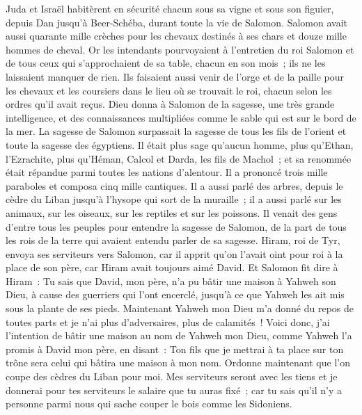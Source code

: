 \begin{multicols}{2}
Juda et Israël habitèrent en sécurité chacun sous sa vigne et sous son figuier, depuis Dan jusqu'à Beer-Schéba, durant toute la vie de Salomon.
Salomon avait aussi quarante mille crèches pour les chevaux destinés à ses chars et douze mille hommes de cheval.
Or les intendants pourvoyaient à l'entretien du roi Salomon et de tous ceux qui s'approchaient de sa table, chacun en son mois~; ils ne les laissaient manquer de rien.
Ils faisaient aussi venir de l'orge et de la paille pour les chevaux et les coursiers dans le lieu où se trouvait le roi, chacun selon les ordres qu'il avait reçus.
Dieu donna à Salomon de la sagesse, une très grande intelligence, et des connaissances multipliées comme le sable qui est sur le bord de la mer.
La sagesse de Salomon surpassait la sagesse de tous les fils de l'orient et toute la sagesse des égyptiens.
Il était plus sage qu'aucun homme, plus qu'Ethan, l'Ezrachite, plus qu'Héman, Calcol et Darda, les fils de Machol~; et sa renommée était répandue parmi toutes les nations d'alentour.
Il a prononcé trois mille paraboles et composa cinq mille cantiques.
Il a aussi parlé des arbres, depuis le cèdre du Liban jusqu'à l'hysope qui sort de la muraille~; il a aussi parlé sur les animaux, sur les oiseaux, sur les reptiles et sur les poissons.
Il venait des gens d'entre tous les peuples pour entendre la sagesse de Salomon, de la part de tous les rois de la terre qui avaient entendu parler de sa sagesse.
\VerseOne{}Hiram, roi de Tyr, envoya ses serviteurs vers Salomon, car il apprit qu'on l'avait oint pour roi à la place de son père, car Hiram avait toujours aimé David.
Et Salomon fit dire à Hiram~:
Tu sais que David, mon père, n'a pu bâtir une maison à Yahweh son Dieu, à cause des guerriers qui l'ont encerclé, jusqu'à ce que Yahweh les ait mis sous la plante de ses pieds.
Maintenant Yahweh mon Dieu m'a donné du repos de toutes parts et je n'ai plus d'adversaires, plus de calamités~!
Voici donc, j'ai l'intention de bâtir une maison au nom de Yahweh mon Dieu, comme Yahweh l'a promis à David mon père, en disant~: Ton fils que je mettrai à ta place sur ton trône sera celui qui bâtira une maison à mon nom.
Ordonne maintenant que l'on coupe des cèdres du Liban pour moi. Mes serviteurs seront avec les tiens et je donnerai pour tes serviteurs le salaire que tu auras fixé~; car tu sais qu'il n'y a personne parmi nous qui sache couper le bois comme les Sidoniens.

\end{multicols}
